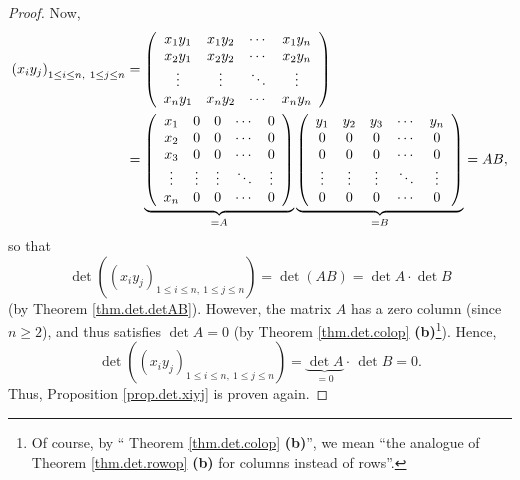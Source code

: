 \begin{proof}
Now,
\begin{align*}
\left(  x_{i}y_{j}\right)  _{1\leq i\leq n,\ 1\leq j\leq n}  &  =\left(
\begin{array}
[c]{cccc}%
x_{1}y_{1} & x_{1}y_{2} & \cdots & x_{1}y_{n}\\
x_{2}y_{1} & x_{2}y_{2} & \cdots & x_{2}y_{n}\\
\vdots & \vdots & \ddots & \vdots\\
x_{n}y_{1} & x_{n}y_{2} & \cdots & x_{n}y_{n}%
\end{array}
\right) \\
&  =\underbrace{\left(
\begin{array}
[c]{ccccc}%
x_{1} & 0 & 0 & \cdots & 0\\
x_{2} & 0 & 0 & \cdots & 0\\
x_{3} & 0 & 0 & \cdots & 0\\
\vdots & \vdots & \vdots & \ddots & \vdots\\
x_{n} & 0 & 0 & \cdots & 0
\end{array}
\right)  }_{=A}\underbrace{\left(
\begin{array}
[c]{ccccc}%
y_{1} & y_{2} & y_{3} & \cdots & y_{n}\\
0 & 0 & 0 & \cdots & 0\\
0 & 0 & 0 & \cdots & 0\\
\vdots & \vdots & \vdots & \ddots & \vdots\\
0 & 0 & 0 & \cdots & 0
\end{array}
\right)  }_{=B}=AB,
\end{align*}
so that%
\[
\det\left(  \left(  x_{i}y_{j}\right)  _{1\leq i\leq n,\ 1\leq j\leq
n}\right)  =\det\left(  AB\right)  =\det A\cdot\det B
\]
(by Theorem \ref{thm.det.detAB}). However, the matrix $A$ has a zero column
(since $n\geq2$), and thus satisfies $\det A=0$ (by Theorem
\ref{thm.det.colop} \textbf{(b)}\footnote{Of course, by \textquotedblleft
Theorem \ref{thm.det.colop} \textbf{(b)}\textquotedblright, we mean
\textquotedblleft the analogue of Theorem \ref{thm.det.rowop} \textbf{(b)} for
columns instead of rows\textquotedblright.}). Hence,%
\[
\det\left(  \left(  x_{i}y_{j}\right)  _{1\leq i\leq n,\ 1\leq j\leq
n}\right)  =\underbrace{\det A}_{=0}\cdot\,\det B=0.
\]
Thus, Proposition \ref{prop.det.xiyj} is proven again.
\end{proof}

